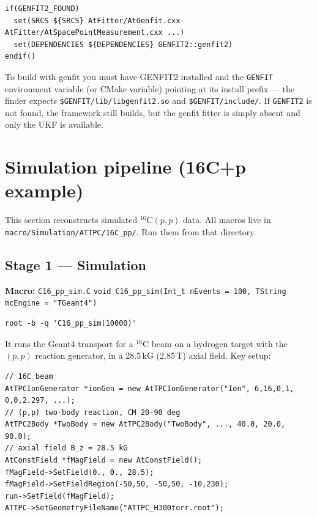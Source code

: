 \documentclass[11pt,a4paper]{article}
\newcommand{\code}[1]{\texttt{\small #1}}
\newcommand{\file}[1]{\texttt{\small #1}}
\begin{document}
\begin{lstlisting}[style=bash]
if(GENFIT2_FOUND)
  set(SRCS ${SRCS} AtFitter/AtGenfit.cxx AtFitter/AtSpacePointMeasurement.cxx ...)
  set(DEPENDENCIES ${DEPENDENCIES} GENFIT2::genfit2)
endif()
\end{lstlisting}

\begin{warnbox}
To build with genfit you must have GENFIT2 installed and the \code{GENFIT}
environment variable (or CMake variable) pointing at its install prefix --- the
finder expects \code{\$GENFIT/lib/libgenfit2.so} and \code{\$GENFIT/include/}.
If \code{GENFIT2} is not found, the framework still builds, but the genfit fitter
is simply absent and only the UKF is available.
\end{warnbox}

\section{Simulation pipeline (16C+p example)}\label{sec:sim}

This section reconstructs simulated $^{16}$C$(p,p)$ data. All macros live in
\file{macro/\allowbreak Simulation/\allowbreak ATTPC/\allowbreak 16C\_pp/}. Run
them from that directory.

\subsection{Stage 1 --- Simulation}

\textbf{Macro:} \file{C16\_pp\_sim.C} \quad
\code{void C16\_pp\_sim(Int\_t nEvents = 100, TString mcEngine = "TGeant4")}

\begin{lstlisting}[style=bash]
root -b -q 'C16_pp_sim(10000)'
\end{lstlisting}

It runs the Geant4 transport for a $^{16}$C beam on a hydrogen target with the
$(p,p)$ reaction generator, in a 28.5\,kG ($2.85$\,T) axial field. Key setup:

\begin{lstlisting}
// 16C beam
AtTPCIonGenerator *ionGen = new AtTPCIonGenerator("Ion", 6,16,0,1, 0,0,2.297, ...);
// (p,p) two-body reaction, CM 20-90 deg
AtTPC2Body *TwoBody = new AtTPC2Body("TwoBody", ..., 40.0, 20.0, 90.0);
// axial field B_z = 28.5 kG
AtConstField *fMagField = new AtConstField();
fMagField->SetField(0., 0., 28.5);
fMagField->SetFieldRegion(-50,50, -50,50, -10,230);
run->SetField(fMagField);
ATTPC->SetGeometryFileName("ATTPC_H300torr.root");
\end{lstlisting}
\end{document}
